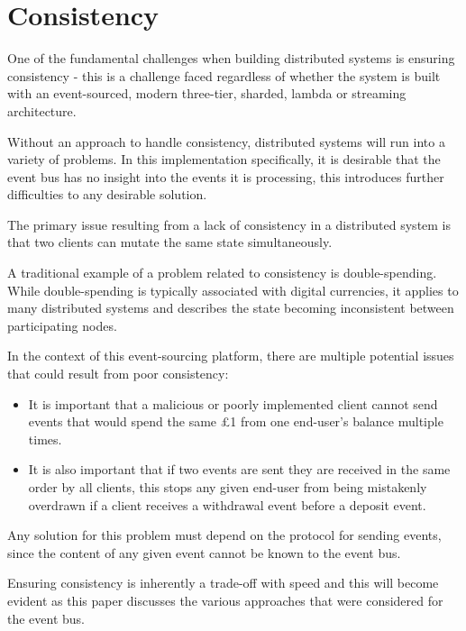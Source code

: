 \documentclass{l3proj}
\begin{document}
\section{Consistency}
\label{sec:consistency}

One of the fundamental challenges when building distributed systems is ensuring consistency - this is a challenge faced regardless of whether the system is built with an event-sourced, modern three-tier, sharded, lambda or streaming architecture.

Without an approach to handle consistency, distributed systems will run into a variety of problems. In this implementation specifically, it is desirable that the event bus has no insight into the events it is processing, this introduces further difficulties to any desirable solution.

The primary issue resulting from a lack of consistency in a distributed system is that two clients can mutate the same state simultaneously.

A traditional example of a problem related to consistency is double-spending. While double-spending is typically associated with digital currencies, it applies to many distributed systems and describes the state becoming inconsistent between participating nodes.

In the context of this event-sourcing platform, there are multiple potential issues that could result from poor consistency:

\begin{itemize}
    \item It is important that a malicious or poorly implemented client cannot send events that would spend the same \pounds1 from one end-user's balance multiple times.
    \item It is also important that if two events are sent they are received in the same order by all clients, this stops any given end-user from being mistakenly overdrawn if a client receives a withdrawal event before a deposit event.
\end{itemize}

Any solution for this problem must depend on the protocol for sending events, since the content of any given event cannot be known to the event bus.

Ensuring consistency is inherently a trade-off with speed and this will become evident as this paper discusses the various approaches that were considered for the event bus.
\end{document}
